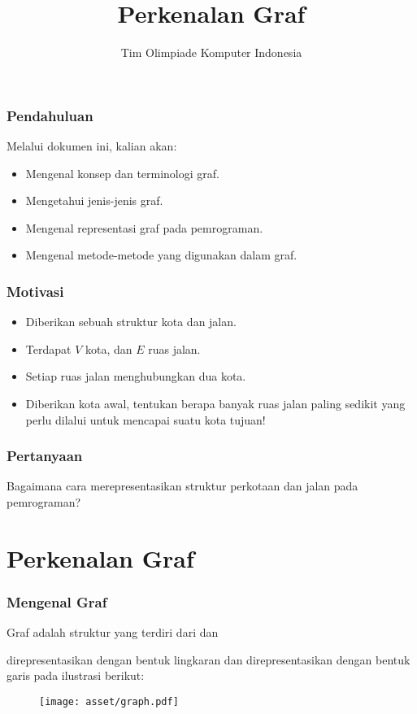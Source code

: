 

\title{Perkenalan Graf}
\author{Tim Olimpiade Komputer Indonesia}
\date{}

\usepackage{verbatim}
\usepackage{multicol}



\begin{frame}
\titlepage
\end{frame}

\begin{frame}
\frametitle{Pendahuluan}
Melalui dokumen ini, kalian akan:
\begin{itemize}
  \item Mengenal konsep dan terminologi graf.
  \item Mengetahui jenis-jenis graf.
  \item Mengenal representasi graf pada pemrograman.
  \item Mengenal metode-metode yang digunakan dalam graf.
\end{itemize}
\end{frame}

\begin{frame}
\frametitle{Motivasi}
\begin{itemize}
  \item Diberikan sebuah struktur kota dan jalan.
  \item Terdapat $V$ kota, dan $E$ ruas jalan.
  \item Setiap ruas jalan menghubungkan dua kota.
  \item Diberikan kota awal, tentukan berapa banyak ruas jalan paling sedikit yang perlu dilalui untuk mencapai suatu kota tujuan!
\end{itemize}
\end{frame}

\begin{frame}
\frametitle{Pertanyaan}
\begin{center}
  \large Bagaimana cara merepresentasikan struktur perkotaan dan jalan pada pemrograman?
\end{center}
\end{frame}

\section{Perkenalan Graf}
\frame{\sectionpage}

\begin{frame}
\frametitle{Mengenal Graf}
Graf adalah struktur yang terdiri dari  dan \newline

\fNode direpresentasikan dengan bentuk lingkaran dan \fedge direpresentasikan dengan bentuk garis pada ilustrasi berikut:

\begin{figure}
  \centering
  \texttt{[image: asset/graph.pdf]}
\end{figure}
\end{frame}

